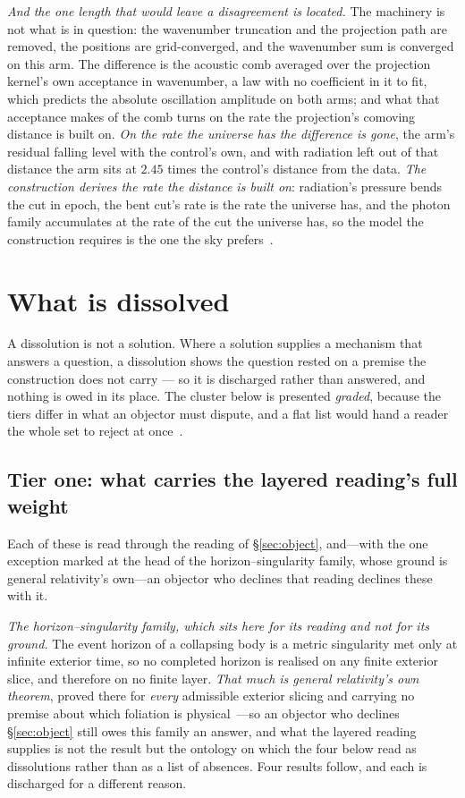 \documentclass[11pt,a4paper]{article}
\theoremstyle{plain}
\theoremstyle{definition}
\begin{document}
\emph{And the one length that would leave a disagreement is located.} The machinery is not what is in
question: the wavenumber truncation and the projection path are removed, the positions are grid-converged, and
the wavenumber sum is converged on this arm. The difference is the acoustic comb averaged over the projection
kernel's own acceptance in wavenumber, a law with no coefficient in it to fit, which predicts the absolute
oscillation amplitude on both arms; and what that acceptance makes of the comb turns on the rate the projection's
comoving distance is built on. \emph{On the rate the universe has the difference is gone}, the arm's residual falling level with
the control's own, and with radiation left out of that distance the arm sits at $2.45$ times the control's
distance from the data. \emph{The construction derives the rate the distance is built on}: radiation's pressure
bends the cut in epoch, the bent cut's rate is the rate the universe has, and the photon family accumulates at
the rate of the cut the universe has, so the model the construction requires is the one the sky
prefers~\cite{JanzenCRcosmology}.



\section{What is dissolved}\label{sec:dissolved}

A dissolution is not a solution. Where a solution supplies a mechanism that answers a question, a dissolution
shows the question rested on a premise the construction does not carry --- so it is discharged rather than
answered, and nothing is owed in its place. The cluster below is presented \emph{graded}, because the tiers
differ in what an objector must dispute, and a flat list would hand a reader the whole set to reject at
once~\cite{JanzenCRframework}.

\subsection{Tier one: what carries the layered reading's full weight}

Each of these is read through the reading of \S\ref{sec:object}, and---with the one exception marked at the
head of the horizon--singularity family, whose ground is general relativity's own---an objector who declines
that reading declines these with it.

\emph{The horizon--singularity family, which sits here for its reading and not for its ground.} The event
horizon of a collapsing body is a metric singularity met only at infinite exterior time, so no completed
horizon is realised on any finite exterior slice, and therefore on no finite layer. \emph{That much is
general relativity's own theorem}, proved there for \emph{every} admissible exterior slicing and carrying no
premise about which foliation is physical~\cite{JanzenBHcausality}---so an objector who declines
\S\ref{sec:object} still owes this family an answer, and what the layered reading supplies is not the result
but the ontology on which the four below read as dissolutions rather than as a list of absences. Four
results follow, and each is discharged for a different reason.
\end{document}
